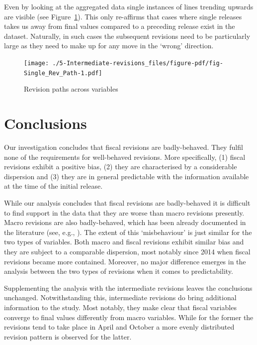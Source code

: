 \documentclass[
  letterpaper,
  authoryear,
  preprint,
  3p]{elsarticle}
\begin{document}
Even by looking at the aggregated data single instances of lines
trending upwards are visible (see Figure~\ref{fig-Single_Rev_Path}).
This only re-affirms that cases where single releases takes us away from
final values compared to a preceding release exist in the dataset.
Naturally, in such cases the subsequent revisions need to be
particularly large as they need to make up for any move in the `wrong'
direction.

\begin{figure}[H]

{\centering \texttt{[image: ./5-Intermediate-revisions\_files/figure-pdf/fig-Single\_Rev\_Path-1.pdf]}

}

\caption{\label{fig-Single_Rev_Path}Revision paths across variables}

\end{figure}


\hypertarget{sec-Conclusions}{%
\chapter{Conclusions}\label{sec-Conclusions}}

Our investigation concludes that fiscal revisions are badly-behaved.
They fulfil none of the requirements for well-behaved revisions. More
specifically, (1) fiscal revisions exhibit a positive bias, (2) they are
characterised by a considerable dispersion and (3) they are in general
predictable with the information available at the time of the initial
release.

While our analysis concludes that fiscal revisions are badly-behaved it
is difficult to find support in the data that they are worse than macro
revisions presently. Macro revisions are also badly-behaved, which has
been already documented in the literature (see, e.g.,
\citet{Faust2005NewsAN}). The extent of this `misbehaviour' is just
similar for the two types of variables. Both macro and fiscal revisions
exhibit similar bias and they are subject to a comparable dispersion,
most notably since 2014 when fiscal revisions became more contained.
Moreover, no major difference emerges in the analysis between the two
types of revisions when it comes to predictability.

Supplementing the analysis with the intermediate revisions leaves the
conclusions unchanged. Notwithstanding this, intermediate revisions do
bring additional information to the study. Most notably, they make clear
that fiscal variables converge to final values differently from macro
variables. While for the former the revisions tend to take place in
April and October a more evenly distributed revision pattern is observed
for the latter.
\end{document}
